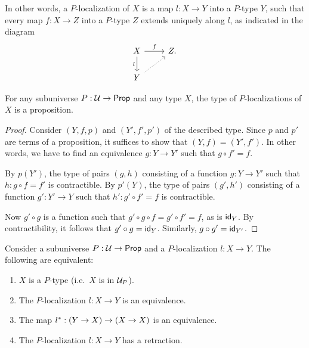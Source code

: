 In other words, a $P$-localization of $X$ is a map $l:X\to Y$ into a $P$-type $Y$, such that every map $f:X\to Z$ into a $P$-type $Z$ extends uniquely along $l$, as indicated in the diagram
\begin{equation*}
\begin{tikzcd}
X \arrow[r,"f"] \arrow[d,swap,"l"] & Z. \\
Y \arrow[ur,densely dotted]
\end{tikzcd}
\end{equation*}

\begin{prp}\label{lem:reflective_uniqueness}
For any subuniverse $P:\UU\to \prop$ and any type $X$, the type of $P$-localizations of $X$ is a proposition.
\end{prp}

\begin{proof}
Consider $(Y,f,p)$ and $(Y',f',p')$ of the described type. Since $p$ and $p'$
are terms of a proposition, it suffices to show that $(Y,f)=(Y',f')$. In
other words, we have to find an equivalence $g:Y\to Y'$ such that $g\circ f'=f$.

By $p(Y')$, the type of
pairs $(g,h)$ consisting of a function $g:Y\to Y'$ such that $h:g\circ f=f'$ is contractible. By
$p'(Y)$, the type of pairs $(g',h')$ consisting of a function $g':Y'\to Y$
such that $h':g'\circ f'=f$ is contractible.

Now $g'\circ g$ is a function such that $g'\circ g\circ f=g'\circ f'=f$, as
is $\idfunc[Y]$. By contractibility, it follows that $g'\circ g=\idfunc[Y]$.
Similarly, $g\circ g'=\idfunc[Y']$.
\end{proof}

\begin{prp}\label{thm:subuniv-modal}
Consider a subuniverse $P:\UU\to\prop$ and a $P$-localization $l:X\to Y$. The following are equivalent:
\begin{enumerate}
\item $X$ is a $P$-type (i.e.~$X$ is in $\UU_P$).
\item The $P$-localization $l:X\to Y$ is an equivalence.
\item The map $\precomp{l}:(Y\to X)\to (X\to X)$ is an equivalence.
\item The $P$-localization $l:X\to Y$ has a retraction.
\end{enumerate}
\end{prp}

